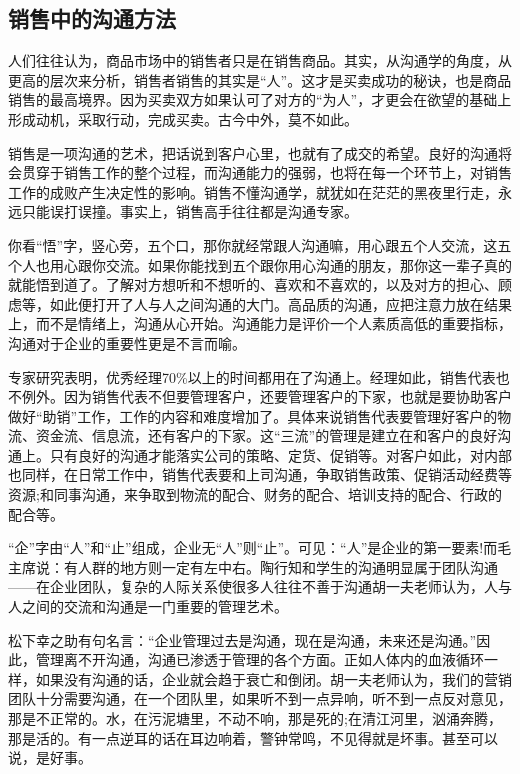 \subsection {销售中的沟通方法}

    人们往往认为，商品市场中的销售者只是在销售商品。其实，从沟通学的角度，从更高的层次来分析，销售者销售的其实是“人”。这才是买卖成功的秘诀，也是商品销售的最高境界。因为买卖双方如果认可了对方的“为人”，才更会在欲望的基础上形成动机，采取行动，完成买卖。古今中外，莫不如此。

    销售是一项沟通的艺术，把话说到客户心里，也就有了成交的希望。良好的沟通将会贯穿于销售工作的整个过程，而沟通能力的强弱，也将在每一个环节上，对销售工作的成败产生决定性的影响。销售不懂沟通学，就犹如在茫茫的黑夜里行走，永远只能误打误撞。事实上，销售高手往往都是沟通专家。

    你看“悟”字，竖心旁，五个口，那你就经常跟人沟通嘛，用心跟五个人交流，这五个人也用心跟你交流。如果你能找到五个跟你用心沟通的朋友，那你这一辈子真的就能悟到道了。了解对方想听和不想听的、喜欢和不喜欢的，以及对方的担心、顾虑等，如此便打开了人与人之间沟通的大门。高品质的沟通，应把注意力放在结果上，而不是情绪上，沟通从心开始。沟通能力是评价一个人素质高低的重要指标，沟通对于企业的重要性更是不言而喻。

    专家研究表明，优秀经理70\%以上的时间都用在了沟通上。经理如此，销售代表也不例外。因为销售代表不但要管理客户，还要管理客户的下家，也就是要协助客户做好“助销”工作，工作的内容和难度增加了。具体来说销售代表要管理好客户的物流、资金流、信息流，还有客户的下家。这“三流”的管理是建立在和客户的良好沟通上。只有良好的沟通才能落实公司的策略、定货、促销等。对客户如此，对内部也同样，在日常工作中，销售代表要和上司沟通，争取销售政策、促销活动经费等资源;和同事沟通，来争取到物流的配合、财务的配合、培训支持的配合、行政的配合等。

    “企”字由“人”和“止”组成，企业无“人”则“止”。可见：“人”是企业的第一要素!而毛主席说：有人群的地方则一定有左中右。陶行知和学生的沟通明显属于团队沟通——在企业团队，复杂的人际关系使很多人往往不善于沟通胡一夫老师认为，人与人之间的交流和沟通是一门重要的管理艺术。

    松下幸之助有句名言：“企业管理过去是沟通，现在是沟通，未来还是沟通。”因此，管理离不开沟通，沟通已渗透于管理的各个方面。正如人体内的血液循环一样，如果没有沟通的话，企业就会趋于衰亡和倒闭。胡一夫老师认为，我们的营销团队十分需要沟通，在一个团队里，如果听不到一点异响，听不到一点反对意见，那是不正常的。水，在污泥塘里，不动不响，那是死的;在清江河里，汹涌奔腾，那是活的。有一点逆耳的话在耳边响着，警钟常鸣，不见得就是坏事。甚至可以说，是好事。

